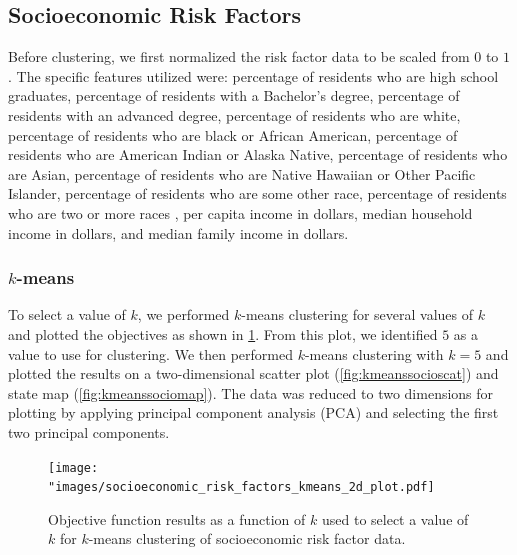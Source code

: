 \documentclass{article}
\begin{document}
\subsection{Socioeconomic Risk Factors}
Before clustering, we first normalized the risk factor data to be scaled from $0$ to $1$. The specific features utilized were: percentage of residents who are high school graduates, percentage of residents with a Bachelor's degree, percentage of residents with an advanced degree, percentage of residents who are white, percentage of residents who are black or African American, percentage of residents who are American Indian or Alaska Native, percentage of residents who are Asian, percentage of residents who are Native Hawaiian or Other Pacific Islander, percentage of residents who are some other race, percentage of residents who are two or more races	, per capita income in dollars, median household income in dollars, and median family income in dollars.

\subsubsection{$k$-means}
To select a value of $k$, we performed $k$-means clustering for several values of $k$ and plotted the objectives as shown in \cref{fig:kmeanssocioselect}. From this plot, we identified $5$ as a value to use for clustering. We then performed $k$-means clustering with $k=5$ and plotted the results on a two-dimensional scatter plot (\cref{fig:kmeanssocioscat}) and state map (\cref{fig:kmeanssociomap}). The data was reduced to two dimensions for plotting by applying principal component analysis (PCA) and selecting the first two principal components.

\begin{figure}[h]
\centering
\caption{Objective function results as a function of $k$ used to select a value of $k$ for $k$-means clustering of socioeconomic risk factor data.}
\texttt{[image: "images/socioeconomic\_risk\_factors\_kmeans\_2d\_plot.pdf]}
\label{fig:kmeanssocioselect}
\end{figure}
\end{document}
